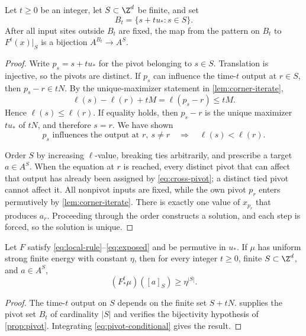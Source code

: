 \begin{lemma}\label{lem:corner-pivots}
Let $t\geq0$ be an integer, let $S\subset\Z^d$ be finite, and set
\[
  B_t=\{s+tu_*:s\in S\}.
\]
After all input sites outside $B_t$ are fixed, the map from the pattern on
$B_t$ to $F^t(x)|_S$ is a bijection $A^{B_t}\to A^S$.
\end{lemma}

\begin{proof}
Write $p_s=s+tu_*$ for the pivot belonging to $s\in S$.  Translation is
injective, so the pivots are distinct.  If $p_s$ can influence the
time-$t$ output at $r\in S$, then
$p_s-r\in tN$.  By the unique-maximizer statement in
\cref{lem:corner-iterate},
\[
  \ell(s)-\ell(r)+tM=\ell(p_s-r)\leq tM.
\]
Hence $\ell(s)\leq\ell(r)$.  If equality holds, then $p_s-r$ is the unique
maximizer $tu_*$ of $tN$, and therefore $s=r$.  We have shown
\begin{equation}\label{eq:cross-pivot}
 p_s\text{ influences the output at }r,\ s\neq r
 \quad\Longrightarrow\quad \ell(s)<\ell(r).
\end{equation}

Order $S$ by increasing $\ell$-value, breaking ties arbitrarily, and prescribe
a target $a\in A^S$.  When the equation at $r$ is reached, every distinct
pivot that can affect that output has already been assigned by
\eqref{eq:cross-pivot}; a distinct tied pivot cannot affect it.  All
nonpivot inputs are fixed, while the own pivot $p_r$ enters permutively by
\cref{lem:corner-iterate}.  There is exactly one value of $x_{p_r}$ that
produces $a_r$.  Proceeding through the order constructs a solution, and
each step is forced, so the solution is unique.
\end{proof}

\begin{theorem}\label{thm:corner}
Let $F$ satisfy \eqref{eq:local-rule}--\eqref{eq:exposed} and be permutive in
$u_*$.  If $\mu$ has uniform strong finite energy with constant $\eta$, then
for every integer $t\geq0$, finite $S\subset\Z^d$, and $a\in A^S$,
\[
  (F^t_*\mu)([a]_S)\geq\eta^{|S|}.
\]
\end{theorem}

\begin{proof}
The time-$t$ output on $S$ depends on the finite set $S+tN$.
 supplies the pivot set $B_t$ of cardinality $|S|$
and verifies the bijectivity hypothesis of \cref{prop:pivot}.  Integrating
\eqref{eq:pivot-conditional} gives the result.
\end{proof}

